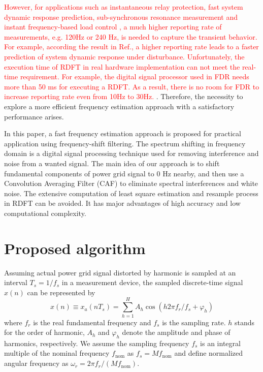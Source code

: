 \documentclass[journal,twoside]{IEEEtran}
\begin{document}
 \textcolor{red}{However, for  applications such as instantaneous relay protection\cite{PRC-024-1}, fast system dynamic response prediction\cite{6863288,CIGRE,68632881}, sub-synchronous resonance measurement \cite{7098450} and instant frequency-based load control \cite{7976165}, a much higher reporting rate of  measurements, e.g. 120Hz or 240 Hz, is needed to capture the transient behavior. For example, according the result in Ref.\cite{CIGRE,68632881}, a higher reporting rate leads to a faster prediction of system dynamic response under disturbance.  Unfortunately, the execution time of RDFT in real hardware implementation can not meet the real-time requirement.
 For example, the digital signal processor used in FDR needs more than 50 ms for executing a RDFT. As a result, there is no room for FDR to increase reporting rate even from 10Hz to 30Hz. }. Therefore,  the necessity to explore a more efficient frequency estimation approach with  a satisfactory performance arises.

 In this paper, a fast frequency estimation approach is proposed for practical application using frequency-shift filtering. The spectrum shifting in frequency domain  is a  digital signal processing technique used for removing interference and noise from a wanted signal\cite{fresh}. 
 The main idea of our approach is to shift fundamental components of power grid signal to 0 Hz nearby, and then use a Convolution Averaging Filter (CAF) to eliminate spectral interferences and white noise. The extensive computation of least square estimation and resample process in RDFT can be avoided. It has major advantages of high accuracy and low computational complexity.
\section{Proposed  algorithm}
Assuming  actual power grid signal distorted by harmonic is sampled at  an interval $T_s=1/f_s$ in a measurement device,  the sampled discrete-time signal $x(n)$ can be represented by
\begin{equation}
x(n)\equiv x_a(nT_s)=\sum_{h=1}^{H}A_h\cos (h2\pi f_r/f_s+\varphi_h)\label{eqn_3}
\end{equation}
where $f_r$ is the real fundamental frequency and $f_s$ is the sampling rate. $h$ stands for the order of harmonic, $A_h$ and $\varphi_h$ denote the amplitude and phase of  harmonics, respectively.
We assume the sampling frequency $f_s$ is an integral multiple of the nominal frequency $f_\mathrm{nom}$ as $f_s=Mf_\mathrm{nom}$ and define normalized angular frequency as  $\omega_r=2\pi f_r/(Mf_\mathrm{nom})$. 
\end{document}
